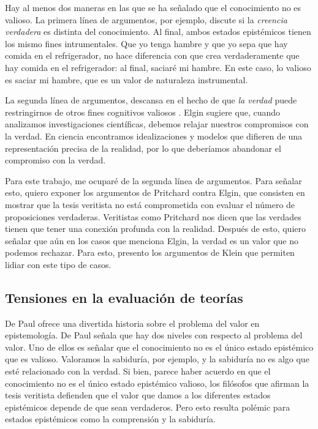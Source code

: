 Hay al menos dos maneras en las que se ha señalado que el conocimiento no es valioso. 
La primera línea de argumentos, por ejemplo, discute si la \textit{creencia verdadera} es distinta del conocimiento.
Al final, ambos estados epistémicos tienen los mismo fines intrumentales.
Que yo tenga hambre y que yo sepa que hay comida en el refrigerador, no hace diferencia con que crea verdaderamente que hay comida en el refrigerador: al final, saciaré mi hambre.
En este caso, lo valioso es saciar mi hambre, que es un valor de naturaleza instrumental.

La segunda línea de argumentos, descansa en el hecho de que \textit{la verdad} puede restringirnos de otros fines cognitivos valiosos \parencite{elgin2017true}.
Elgin sugiere que, cuando analizamos investigaciones científicas, debemos relajar nuestros compromisos con la verdad.
En ciencia encontramos idealizaciones y modelos que difieren de una representación precisa de la realidad, por lo que deberíamos abandonar el compromiso con la verdad.

Para este trabajo, me ocuparé de la segunda línea de argumentos. 
Para señalar esto, quiero exponer los argumentos de Pritchard contra Elgin, que consisten en mostrar que la tesis veritista no está comprometida con evaluar el número de proposiciones verdaderas.
Veritistas como Pritchard nos dicen que las verdades tienen que tener una conexión profunda con la realidad.
Después de esto, quiero señalar que aún en los casos que menciona Elgin, la verdad es un valor que no podemos rechazar.
Para esto, presento los argumentos de Klein que permiten lidiar con este tipo de casos. 

\subsection{Tensiones en la evaluación de teorías}

De Paul \parencite{depaul2001} ofrece una divertida historia sobre el problema del valor en epistemología.
De Paul señala que hay dos niveles con respecto al problema del valor.
Uno de ellos es señalar que el conocimiento no es el único estado epistémico que es valioso.
Valoramos la sabiduría, por ejemplo, y la sabiduría no es algo que esté relacionado con la verdad.
Si bien, parece haber acuerdo en que el conocimiento no es el único estado epistémico valioso, los filósofos que afirman la tesis veritista defienden que el valor que damos a los diferentes estados epistémicos depende de que sean verdaderos. 
Pero esto resulta polémic para estados epistémicos como la comprensión y la sabiduría.

